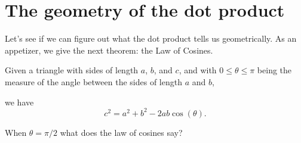 \documentclass{ximera}
\begin{document}
\section{The geometry of the dot product}

Let's see if we can figure out what the dot product tells us geometrically. As
an appetizer, we give the next theorem: the Law of Cosines.

\begin{theorem}
  Given a triangle with sides of length $a$, $b$, and $c$, and with
  $0\le\theta\le\pi$ being the measure of the angle between the sides
  of length $a$ and $b$,
  \begin{image}
  \end{image}
  we have
  \[
  c^2 = a^2+b^2-2ab\cos(\theta).
  \]
\end{theorem}
\begin{question}
  When $\theta = \pi/2$ what does the law of cosines say?
  \begin{prompt}
    \begin{multipleChoice}
    \end{multipleChoice}
  \end{prompt}
\end{question}
\end{document}
